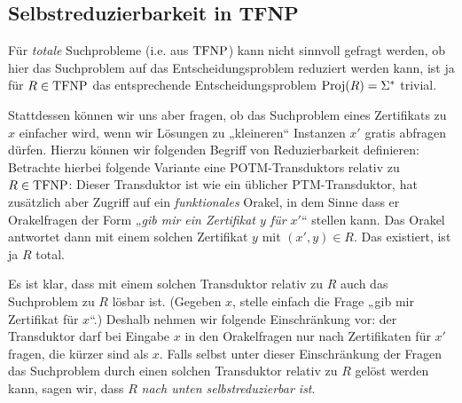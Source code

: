 \subsection*{Selbstreduzierbarkeit in TFNP}

Für \emph{totale} Suchprobleme (i.e. aus $\mathrm{TFNP}$) kann nicht sinnvoll gefragt werden, ob hier das Suchproblem auf das Entscheidungsproblem reduziert werden kann, ist ja für $R\in\mathrm{TFNP}$ das entsprechende Entscheidungsproblem $\operatorname{Proj}(R)=\Sigma^*$ trivial.

Stattdessen können wir uns aber fragen, ob das Suchproblem eines Zertifikats zu $x$ einfacher wird, wenn wir Lösungen zu „kleineren“ Instanzen $x'$ gratis abfragen dürfen.
Hierzu können wir folgenden Begriff von Reduzierbarkeit definieren:
Betrachte hierbei folgende Variante eine POTM-Transduktors relativ zu $R\in\mathrm{TFNP}$: Dieser Transduktor ist wie ein üblicher PTM-Transduktor, hat zusätzlich aber Zugriff auf ein \emph{funktionales} Orakel, in dem Sinne dass er Orakelfragen der Form „\emph{gib mir ein Zertifikat $y$ für $x'$}“ stellen kann. Das Orakel antwortet dann mit einem solchen Zertifikat $y$ mit $(x', y)\in R$. Das existiert, ist ja $R$ total. 

Es ist klar, dass mit einem solchen Transduktor relativ zu $R$ auch das Suchproblem zu $R$ lösbar ist. (Gegeben $x$, stelle einfach die Frage „gib mir Zertifikat für $x$“.) Deshalb nehmen wir folgende Einschränkung vor: der Transduktor darf bei Eingabe $x$ in den Orakelfragen nur nach Zertifikaten für $x'$ fragen, die kürzer sind als $x$.
Falls selbst unter dieser Einschränkung der Fragen das Suchproblem durch einen solchen Transduktor relativ zu $R$ gelöst werden kann, sagen wir, dass $R$ \emph{nach unten selbstreduzierbar ist}.

